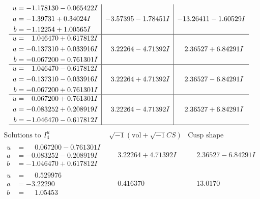 \documentclass[1p]{elsarticle_modified}
\theoremstyle{definition}
\newcommand{\I}{\sqrt{-1}}
\begin{document}
$$\begin{array}{c|c|c}
\begin{aligned}
u &= -1.178130 - 0.065422 I \\
a &= -1.39731 + 0.34024 I \\
b &= -1.12254 + 1.00565 I\end{aligned}
 & -3.57395 - 1.78451 I & -13.26411 - 1.60529 I \\ \hline\begin{aligned}
u &= \phantom{-}1.046470 + 0.617812 I \\
a &= -0.137310 + 0.033916 I \\
b &= -0.067200 - 0.761301 I\end{aligned}
 & \phantom{-}3.22264 - 4.71392 I & \phantom{-}2.36527 + 6.84291 I \\ \hline\begin{aligned}
u &= \phantom{-}1.046470 - 0.617812 I \\
a &= -0.137310 - 0.033916 I \\
b &= -0.067200 + 0.761301 I\end{aligned}
 & \phantom{-}3.22264 + 4.71392 I & \phantom{-}2.36527 - 6.84291 I \\ \hline\begin{aligned}
u &= \phantom{-}0.067200 + 0.761301 I \\
a &= -0.083252 + 0.208919 I \\
b &= -1.046470 - 0.617812 I\end{aligned}
 & \phantom{-}3.22264 - 4.71392 I & \phantom{-}2.36527 + 6.84291 I\\
 \hline 
 \end{array}$$\newpage$$\begin{array}{c|c|c}  
\text{Solutions to }I^u_{4}& \I (\text{vol} + \sqrt{-1}CS) & \text{Cusp shape}\\
 \hline 
\begin{aligned}
u &= \phantom{-}0.067200 - 0.761301 I \\
a &= -0.083252 - 0.208919 I \\
b &= -1.046470 + 0.617812 I\end{aligned}
 & \phantom{-}3.22264 + 4.71392 I & \phantom{-}2.36527 - 6.84291 I \\ \hline\begin{aligned}
u &= \phantom{-}0.529976\phantom{ +0.000000I} \\
a &= -3.22290\phantom{ +0.000000I} \\
b &= \phantom{-}1.05453\phantom{ +0.000000I}\end{aligned}
 & \phantom{-}0.416370\phantom{ +0.000000I} & \phantom{-}13.0170\phantom{ +0.000000I} \\ \hline\begin{aligned}

\end{aligned}
\end{array}$$
\end{document}
